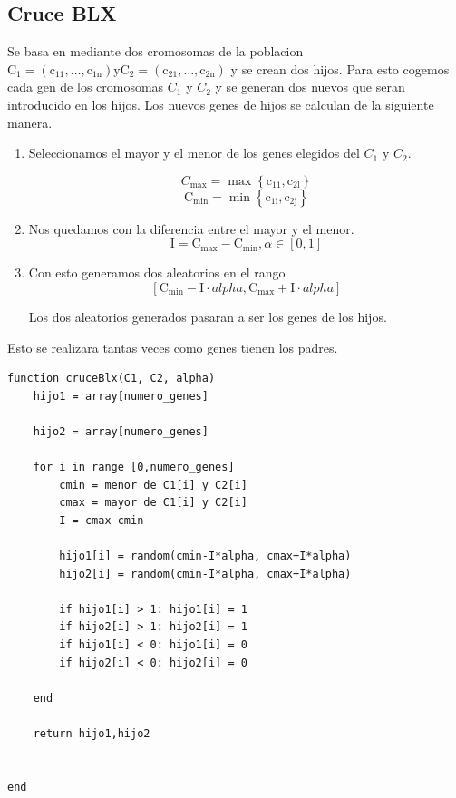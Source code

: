 \documentclass[titlepage]{article}
\begin{document}
	\subsection{Cruce BLX}
	Se basa en mediante dos cromosomas de la poblacion $\mathrm{C}_{1}=\left(\mathrm{c}_{11}, \ldots, \mathrm{c}_{1 \mathrm{n}}\right)   \mathrm{y}  \mathrm{C}_{2}=\left(\mathrm{c}_{21}, \ldots, \mathrm{c}_{2 \mathrm{n}}\right)$ y se crean dos hijos. Para esto cogemos cada gen de los cromosomas $C_1$ y $C_2$ y se generan dos nuevos que seran introducido en los hijos. Los nuevos genes de hijos se calculan de la siguiente manera.
	
	\begin{enumerate}
		\item Seleccionamos el mayor y el menor de los genes elegidos del $C_1$ y $C_2$.
		 
		$$
		C_{\max }=\max \left\{\mathrm{c}_{11}, \mathrm{c}_{2 \mathrm{l}}\right\}
		$$
		$$
		\mathrm{C}_{\mathrm{min}}=\min \left\{\mathrm{c}_{1 \mathrm{i}}, \mathrm{c}_{2 \mathrm{j}}\right\}
		$$
		\item Nos quedamos con la diferencia entre el mayor y el menor.
		$$
		\mathrm{I}=\mathrm{C}_{\max }-\mathrm{C}_{\min }, \alpha \in[0,1]
		$$
		\item Con esto generamos dos aleatorios en el rango 
		$$
		\left[\mathrm{C}_{\min }-\mathrm{I} \cdot alpha, \mathrm{C}_{\max }+\mathrm{I} \cdot alpha \right]
		$$
		
		Los dos aleatorios generados pasaran a ser los genes de los hijos.
		
	\end{enumerate} 
	Esto se realizara tantas veces como genes tienen los padres.
	
	
	
	\begin{lstlisting}
function cruceBlx(C1, C2, alpha)
	hijo1 = array[numero_genes]
	
	hijo2 = array[numero_genes]
	
	for i in range [0,numero_genes]
		cmin = menor de C1[i] y C2[i]
		cmax = mayor de C1[i] y C2[i]
		I = cmax-cmin
		
		hijo1[i] = random(cmin-I*alpha, cmax+I*alpha)
		hijo2[i] = random(cmin-I*alpha, cmax+I*alpha)
		
		if hijo1[i] > 1: hijo1[i] = 1
		if hijo2[i] > 1: hijo2[i] = 1
		if hijo1[i] < 0: hijo1[i] = 0
		if hijo2[i] < 0: hijo2[i] = 0
		
	end
	
	return hijo1,hijo2
	
	
end

	\end{lstlisting}
	
\end{document}
